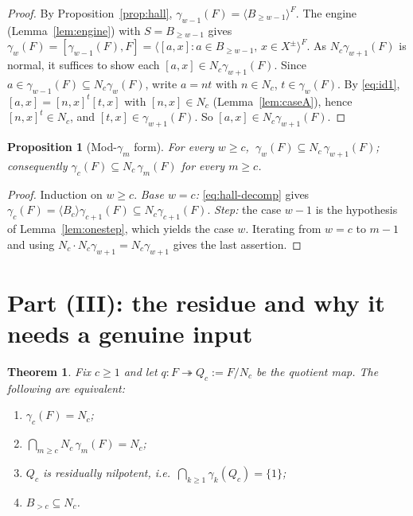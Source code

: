 \documentclass{amsart}
\newtheorem{theorem}{Theorem}
\newtheorem{proposition}{Proposition}
\theoremstyle{definition}
\theoremstyle{remark}
\begin{document}
\begin{proof}
By Proposition~\ref{prop:hall}, $\gamma_{w-1}(F)=\langle B_{\ge w-1}\rangle^{F}$.
The engine (Lemma~\ref{lem:engine}) with $S=B_{\ge w-1}$ gives
$\gamma_w(F)=[\gamma_{w-1}(F),F]=\langle[a,x]:a\in B_{\ge w-1},\,x\in X^{\pm}\rangle
^{F}$. As $N_c\gamma_{w+1}(F)$ is normal, it suffices to show each $[a,x]\in
N_c\gamma_{w+1}(F)$. Since $a\in\gamma_{w-1}(F)\subseteq N_c\gamma_w(F)$, write
$a=nt$ with $n\in N_c$, $t\in\gamma_w(F)$. By \eqref{eq:id1},
$[a,x]=[n,x]^{t}[t,x]$ with $[n,x]\in N_c$ (Lemma~\ref{lem:caseA}), hence
$[n,x]^{t}\in N_c$, and $[t,x]\in\gamma_{w+1}(F)$. So $[a,x]\in N_c\gamma_{w+1}(F)$.
\end{proof}

\begin{proposition}[Mod-$\gamma_m$ form]\label{prop:moddescent}
For every $w\ge c$, $\ \gamma_w(F)\subseteq N_c\,\gamma_{w+1}(F)$; consequently
$\gamma_c(F)\subseteq N_c\,\gamma_m(F)$ for every $m\ge c$.
\end{proposition}

\begin{proof}
Induction on $w\ge c$. \emph{Base $w=c$:} \eqref{eq:hall-decomp} gives
$\gamma_c(F)=\langle B_c\rangle\gamma_{c+1}(F)\subseteq N_c\gamma_{c+1}(F)$.
\emph{Step:} the case $w-1$ is the hypothesis of Lemma~\ref{lem:onestep}, which
yields the case $w$. Iterating from $w=c$ to $m-1$ and using
$N_c\cdot N_c\gamma_{w+1}=N_c\gamma_{w+1}$ gives the last assertion.
\end{proof}

\section{Part (III): the residue and why it needs a genuine input}\label{sec:reduce}

\begin{theorem}\label{thm:equiv}
Fix $c\ge1$ and let $q\colon F\twoheadrightarrow Q_c:=F/N_c$ be the quotient map.
The following are equivalent:
\begin{enumerate}
\item[(a)] $\gamma_c(F)=N_c$;
\item[(b)] $\bigcap_{m\ge c} N_c\,\gamma_m(F)=N_c$;
\item[(c)] $Q_c$ is residually nilpotent, i.e.\ $\bigcap_{k\ge1}\gamma_k(Q_c)=\{1\}$;
\item[(d)] $B_{>c}\subseteq N_c$.
\end{enumerate}
\end{theorem}
\end{document}
